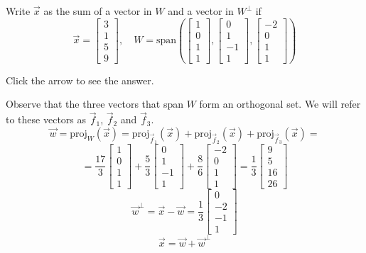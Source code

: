 \documentclass{ximera}
\begin{document}
\begin{problem}\label{OrthoDecomp3}  Write $\vec{x}$ as the sum of a vector in $W$ and a vector in $W^\perp$ if
$$\vec{x} = \begin{bmatrix}3\\ 1\\ 5\\ 9\end{bmatrix}, \quad W = \mbox{span}\left(\begin{bmatrix}1\\ 0\\ 1\\ 1\end{bmatrix}, \begin{bmatrix}0\\ 1\\ -1\\ 1\end{bmatrix}, \begin{bmatrix}-2\\ 0\\ 1\\ 1\end{bmatrix}\right)$$

Click the arrow to see the answer.
\begin{expandable}
Observe that the three vectors that span $W$ form an orthogonal set.  We will refer to these vectors as $\vec{f}_1$, $\vec{f}_2$ and $\vec{f}_3$.
$$\vec{w}=\text{proj}_W(\vec{x})=\text{proj}_{\vec{f}_1}(\vec{x})+\text{proj}_{\vec{f}_2}(\vec{x})+\text{proj}_{\vec{f}_3}(\vec{x})=$$
$$=\frac{17}{3}\begin{bmatrix}1\\0\\1\\1\end{bmatrix}+\frac{5}{3}\begin{bmatrix}0\\1\\-1\\1\end{bmatrix}+\frac{8}{6}\begin{bmatrix}-2\\0\\1\\1\end{bmatrix}=\frac{1}{3}\begin{bmatrix}9\\5\\16\\26\end{bmatrix}$$
$$\vec{w}^{\perp}=\vec{x}-\vec{w}=\frac{1}{3}\begin{bmatrix}0\\-2\\-1\\1\end{bmatrix}$$
$$\vec{x}=\vec{w}+\vec{w}^{\perp}$$
\end{expandable}
\end{problem}
\end{document}
